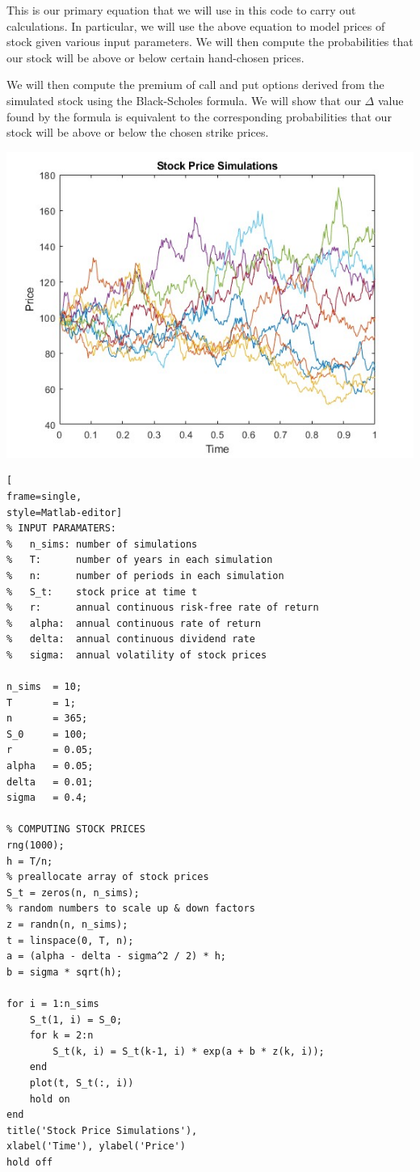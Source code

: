 \documentclass[letterpaper,12pt]{article}
\begin{document}
This is our primary equation that we will use in this code to carry out calculations. 
In particular, we will use the above equation to model prices of stock given 
various input parameters. We will then compute the probabilities that our stock 
will be above or below certain hand-chosen prices. 

We will then compute the premium of call and put options derived from the 
simulated stock using the Black-Scholes formula. We will show that our $\Delta$ 
value found by the formula is equivalent to the corresponding probabilities 
that our stock will be above or below the chosen strike prices.

\includegraphics[scale=0.75]{stock_sims}
\begin{lstlisting}[
frame=single,
style=Matlab-editor]
% INPUT PARAMATERS:
%   n_sims: number of simulations
%   T:      number of years in each simulation
%   n:      number of periods in each simulation
%   S_t:    stock price at time t
%   r:      annual continuous risk-free rate of return
%   alpha:  annual continuous rate of return
%   delta:  annual continuous dividend rate
%   sigma:  annual volatility of stock prices

n_sims  = 10;
T       = 1;
n       = 365;
S_0     = 100;
r       = 0.05;
alpha   = 0.05;
delta   = 0.01;
sigma   = 0.4;

% COMPUTING STOCK PRICES
rng(1000);
h = T/n;
% preallocate array of stock prices
S_t = zeros(n, n_sims);
% random numbers to scale up & down factors
z = randn(n, n_sims);
t = linspace(0, T, n);
a = (alpha - delta - sigma^2 / 2) * h;
b = sigma * sqrt(h);

for i = 1:n_sims
    S_t(1, i) = S_0;
    for k = 2:n
        S_t(k, i) = S_t(k-1, i) * exp(a + b * z(k, i));
    end
    plot(t, S_t(:, i))
    hold on
end
title('Stock Price Simulations'), 
xlabel('Time'), ylabel('Price')
hold off
\end{lstlisting}
\end{document}
